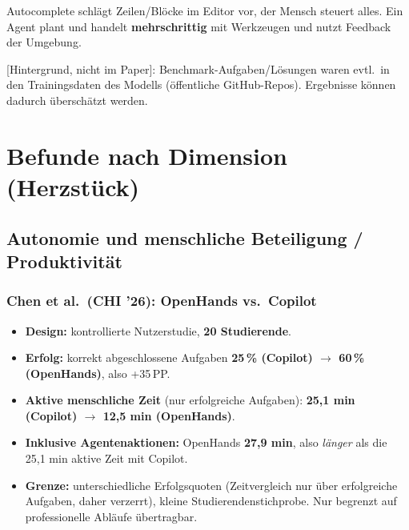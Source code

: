 \documentclass[12pt,a4paper]{article}
\newcommand{\hg}{\textcolor{grau}{\small[Hintergrund, nicht im Paper]}}
\newcommand{\pp}{\,PP}
\begin{document}
\begin{description}[style=nextline,leftmargin=1.2em,itemsep=0.45em]
  \item[Codevervollständigung vs.\ Agent] Autocomplete schlägt Zeilen/Blöcke im Editor vor, der Mensch steuert alles. Ein Agent plant und handelt \textbf{mehrschrittig} mit Werkzeugen und nutzt Feedback der Umgebung.
  \item[Data Contamination] \hg: Benchmark-Aufgaben/Lösungen waren evtl.\ in den Trainingsdaten des Modells (öffentliche GitHub-Repos). Ergebnisse können dadurch überschätzt werden.
\end{description}

\section{Befunde nach Dimension (Herzstück)}
\label{sec:befunde}

\subsection{Autonomie und menschliche Beteiligung / Produktivität}

\subsubsection*{Chen et al.\ (CHI '26): OpenHands vs.\ Copilot}
\begin{itemize}
  \item \textbf{Design:} kontrollierte Nutzerstudie, \textbf{20 Studierende}.
  \item \textbf{Erfolg:} korrekt abgeschlossene Aufgaben \textbf{25\,\% (Copilot) $\to$ 60\,\% (OpenHands)}, also +35\pp.
  \item \textbf{Aktive menschliche Zeit} (nur erfolgreiche Aufgaben): \textbf{25,1 min (Copilot) $\to$ 12,5 min (OpenHands)}.
  \item \textbf{Inklusive Agentenaktionen:} OpenHands \textbf{27,9 min}, also \emph{länger} als die 25,1 min aktive Zeit mit Copilot.
  \item \textbf{Grenze:} unterschiedliche Erfolgsquoten (Zeitvergleich nur über erfolgreiche Aufgaben, daher verzerrt), kleine Studierendenstichprobe. Nur begrenzt auf professionelle Abläufe übertragbar.
\end{itemize}
\end{document}

